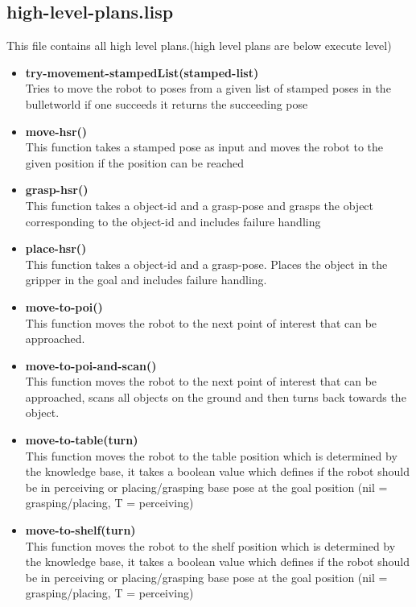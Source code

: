 \documentclass[main.tex]{subfiles}
\begin{document}
	    \subsection{high-level-plans.lisp}
	    This file contains all high level plans.(high level plans are below execute level)
	    \begin{itemize}
		\item \textbf{try-movement-stampedList(stamped-list)} \\
		Tries to move the robot to poses from a given list of stamped poses in the bulletworld if one succeeds it returns the succeeding pose 
	    \item \textbf{move-hsr()} \\
	    This function takes a stamped pose as input and moves the robot to the given position if the position can be reached
	    \item \textbf{grasp-hsr()} \\
	    This function takes a object-id and a grasp-pose and grasps the object corresponding to the object-id and includes failure handling
	    \item \textbf{place-hsr()} \\
	    This function takes a object-id and a grasp-pose. Places the object in the gripper in the goal and includes failure handling.
	    \item \textbf{move-to-poi()} \\
	    This function moves the robot to the next point of interest that can be approached. 
	    \item \textbf{move-to-poi-and-scan()} \\
	    This function moves the robot to the next point of interest that can be approached, scans all objects on the ground and then turns back towards the object.
	    \item \textbf{move-to-table(turn)} \\
	    This function moves the robot to the table position which is determined by the knowledge base, it takes a boolean value which defines if the robot should be in perceiving or placing/grasping base pose at the goal position (nil = grasping/placing, T = perceiving) 
	    \item \textbf{move-to-shelf(turn)} \\
	    This function moves the robot to the shelf position which is determined by the knowledge base, it takes a boolean value which defines if the robot should be in perceiving or placing/grasping base pose at the goal position (nil = grasping/placing, T = perceiving) 
		\end{itemize}
\end{document}
